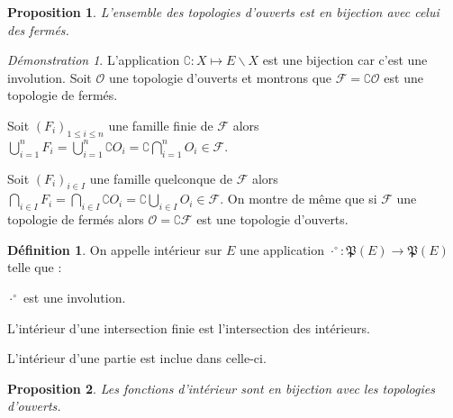 \documentclass[a4paper, 11pt, french]{book}
\newenvironment{itemise}{\itemize}{\enditemize}
\theoremstyle{plain} %
\newtheorem{proposition}{Proposition}
\theoremstyle{definition} %
\newtheorem{definition}{Définition}
\theoremstyle{remark} %
\newtheorem*{demonstration}{Démonstration}
\renewcommand{\setminus}{\backslash}
\newcommand{\1}{\mathds{1}}
\newcommand{\infegal}{\leqslant}
\begin{document}
\begin{proposition}
	L'ensemble des topologies d'ouverts est en bijection avec celui des fermés.
\end{proposition}

\begin{demonstration}
	L'application $\complement\colon X\longmapsto E\setminus X$ est une bijection car c'est une involution.
	Soit $\mathscr{O}$ une topologie d'ouverts et montrons que $\mathscr{F}=\complement\mathscr{O}$ est une topologie de fermés.
	\begin{itemise}
		\item Soit $(F_i)_{1\infegal i\infegal n}$ une famille finie de $\mathscr{F}$ alors
		$\bigcup_{i=1}^nF_i=\bigcup_{i=1}^n\complement O_i=\complement\bigcap_{i=1}^nO_i\in\mathscr{F}$.
		\item Soit $(F_i)_{i\in I}$ une famille quelconque de $\mathscr{F}$ alors
		$\bigcap_{i\in I}F_i=\bigcap_{i\in I}\complement O_i=\complement\bigcup_{i\in I}O_i\in\mathscr{F}$.
	\end{itemise}
	On montre de même que si $\mathscr{F}$ une topologie de fermés alors $\mathscr{O}=\complement\mathscr{F}$ est une topologie d'ouverts.
\end{demonstration}

\begin{definition}
	On appelle intérieur sur $E$ une application $\cdot^\circ\colon\mathfrak{P}(E)\rightarrow\mathfrak{P}(E)$ telle que :
	\begin{itemise}
		\item $\cdot^\circ$ est une involution.
		\item L'intérieur d'une intersection finie est l'intersection des intérieurs.
		\item L'intérieur d'une partie est inclue dans celle-ci.
	\end{itemise}
\end{definition}

\begin{proposition}
	Les fonctions d'intérieur sont en bijection avec les topologies d'ouverts.
\end{proposition}
\end{document}
